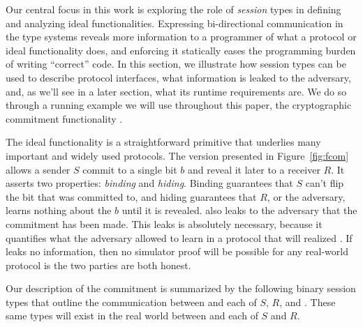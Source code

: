 
Our central focus in this work is exploring the role of \emph{session} types in defining and analyzing ideal functionalities.
Expressing bi-directional communication in the type systems reveals more information to a programmer of what a protocol or ideal functionality does, and enforcing it statically eases the programming burden of writing ``correct'' code.
In this section, we illustrate how session types can be used to describe protocol interfaces, what information is leaked to the adversary, and, as we'll see in a later section, what its runtime requirements are.
We do so through a running example we will use throughout this paper, the cryptographic commitment functionality \Fcom.

The ideal functionality \Fcom is a straightforward primitive that underlies many important and widely used protocols. 
The version presented in Figure~\ref{fig:fcom} allows a sender $S$ commit to a single bit $b$ and reveal it later to a receiver $R$.
It asserts two properties: \emph{binding} and \emph{hiding}.
Binding guarantees that $S$ can't flip the bit that was committed to, and hiding guarantees that $R$, or the adversary, learns nothing about the $b$ until it is revealed.
\Fcom also leaks to the adversary that the commitment has been made.
This leaks is absolutely necessary, because it quantifies what the adversary allowed to learn in a protocol that will realized \Fcom. 
If \Fcom leaks no information, then no simulator proof will be possible for any real-world protocol is the two parties are both honest.



Our description of the commitment is summarized by the following binary session types that outline the communication between \Fcom and each of $S$, $R$, and \A.
These same types will exist in the real world between \Z and each of $S$ and $R$.


